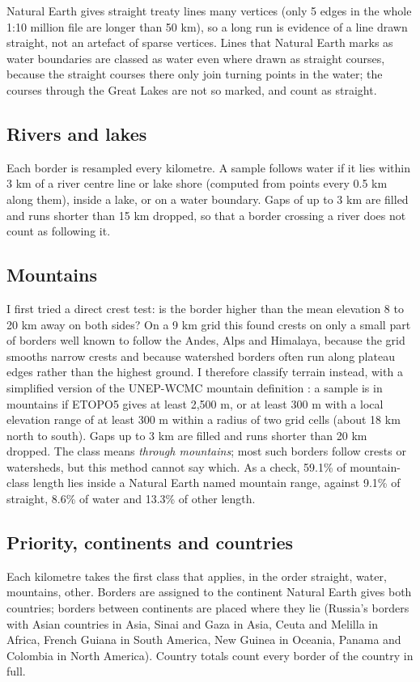 \documentclass[11pt,a4paper]{article}
\begin{document}
Natural Earth gives straight treaty lines many vertices (only 5 edges in the whole 1:10 million file are longer than 50 km), so a long run is evidence of a line drawn straight, not an artefact of sparse vertices. Lines that Natural Earth marks as water boundaries are classed as water even where drawn as straight courses, because the straight courses there only join turning points in the water; the courses through the Great Lakes are not so marked, and count as straight.

\subsection{Rivers and lakes}
Each border is resampled every kilometre. A sample follows water if it lies within 3 km of a river centre line or lake shore (computed from points every 0.5 km along them), inside a lake, or on a water boundary. Gaps of up to 3 km are filled and runs shorter than 15 km dropped, so that a border crossing a river does not count as following it.

\subsection{Mountains}
I first tried a direct crest test: is the border higher than the mean elevation 8 to 20 km away on both sides? On a 9 km grid this found crests on only a small part of borders well known to follow the Andes, Alps and Himalaya, because the grid smooths narrow crests and because watershed borders often run along plateau edges rather than the highest ground. I therefore classify terrain instead, with a simplified version of the UNEP-WCMC mountain definition \citep{kapos2000}: a sample is in mountains if ETOPO5 gives at least 2,500 m, or at least 300 m with a local elevation range of at least 300 m within a radius of two grid cells (about 18 km north to south). Gaps up to 3 km are filled and runs shorter than 20 km dropped. The class means \emph{through mountains}; most such borders follow crests or watersheds, but this method cannot say which. As a check, 59.1\% of mountain-class length lies inside a Natural Earth named mountain range, against 9.1\% of straight, 8.6\% of water and 13.3\% of other length.

\subsection{Priority, continents and countries}
Each kilometre takes the first class that applies, in the order straight, water, mountains, other. Borders are assigned to the continent Natural Earth gives both countries; borders between continents are placed where they lie (Russia's borders with Asian countries in Asia, Sinai and Gaza in Asia, Ceuta and Melilla in Africa, French Guiana in South America, New Guinea in Oceania, Panama and Colombia in North America). Country totals count every border of the country in full.
\end{document}
